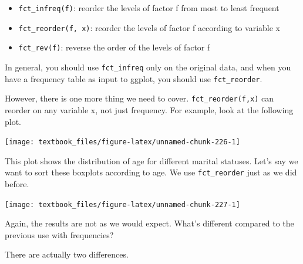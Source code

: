 \documentclass[]{tufte-book}
\newenvironment{Shaded}{}{}
\newcommand{\KeywordTok}[1]{\textcolor[rgb]{0.00,0.44,0.13}{\textbf{#1}}}
\newcommand{\NormalTok}[1]{#1}
\newcommand{\OperatorTok}[1]{\textcolor[rgb]{0.40,0.40,0.40}{#1}}
\newcommand{\StringTok}[1]{\textcolor[rgb]{0.25,0.44,0.63}{#1}}
\providecommand{\tightlist}{%
  \setlength{\itemsep}{0pt}\setlength{\parskip}{0pt}}
\begin{document}
\begin{itemize}
\tightlist
\item
  \texttt{fct\_infreq(f)}: reorder the levels of factor f from most to least frequent
\item
  \texttt{fct\_reorder(f,\ x)}: reorder the levels of factor f according to variable x
\item
  \texttt{fct\_rev(f)}: reverse the order of the levels of factor f
\end{itemize}

In general, you should use \texttt{fct\_infreq} only on the original data, and when you have a frequency table as input to ggplot, you should use \texttt{fct\_reorder}.

However, there is one more thing we need to cover. \texttt{fct\_reorder(f,x)} can reorder on any variable x, not just frequency. For example, look at the following plot.

\begin{Shaded}
\end{Shaded}

\texttt{[image: textbook\_files/figure-latex/unnamed-chunk-226-1]}

This plot shows the distribution of age for different marital statuses. Let's say we want to sort these boxplots according to age. We use \texttt{fct\_reorder} just as we did before.

\begin{Shaded}
\end{Shaded}

\texttt{[image: textbook\_files/figure-latex/unnamed-chunk-227-1]}

Again, the results are not as we would expect. What's different compared to the previous use with frequencies?

There are actually two differences.
\end{document}
